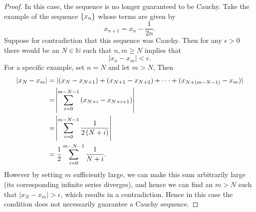 \documentclass{article}
\newcommand{\N}{\mathbb{N}}
\begin{document}
\begin{proof}

In this case, the sequence is no longer guaranteed to be Cauchy.
Take the example of the sequence $\cbr{x_n}$ whose terms are given by
%
\begin{equation*}
    x_{n + 1} = x_n - \frac{1}{2 n}
    .
\end{equation*}
%
Suppose for contradiction that this sequence  was Cauchy. Then for any
$\epsilon > 0$ there would be an $N \in \N$ such that $n, m \geq N$ implies
that
%
\begin{equation*}
    |x_n - x_m| < \epsilon
    .
\end{equation*}
%
For a specific example, set $n = N$ and let $m > N$,
Then
%
\begin{align*}
    |x_N - x_m|
        &= |(x_N - x_{N + 1}) + (x_{N + 1} - x_{N + 2}) + \cdots + (x_{N + (m - N - 1)} - x_m)| \\
        &= \envert{ \sum_{i = 0}^{m - N - 1} \del{x_{N + i} - x_{N + i + 1}} } \\
        &= \envert{ \sum_{i = 0}^{m - N - 1} \frac{1}{2 \del{N + i}} } \\
        &= \frac{1}{2} \sum_{i = 0}^{m - N - 1} \frac{1}{N + i}
    .
\end{align*}
%
However by setting $m$ sufficiently large, we can make this sum
arbitrarily large (its corresponding infinite series diverges), and
hence we can find an $m > N$ such that $|x_N - x_m| > \epsilon$, which
results in a contradiction. Hence in this case the condition does not
necessarily guarantee a Cauchy sequence.

\end{proof}
\end{document}
